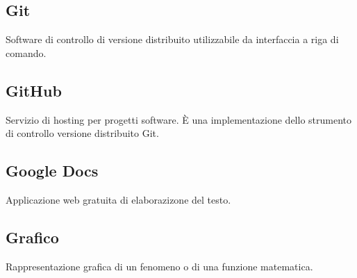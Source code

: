 \documentclass[../glossario.tex]{subfiles}
\begin{document}
\subsection*{Git}
Software di controllo di versione distribuito utilizzabile da interfaccia a riga di comando.

\subsection*{GitHub} 
Servizio di hosting per progetti software. È una implementazione dello strumento di controllo versione distribuito Git.


\subsection*{Google Docs} 
Applicazione web gratuita di elaborazizone del testo.

\subsection*{Grafico} 
Rappresentazione grafica di un fenomeno o di una funzione matematica.

    
\end{document}
